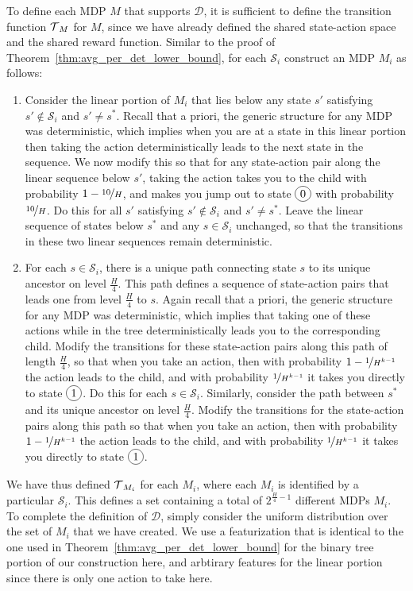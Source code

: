 \documentclass[11pt,twoside]{article}
\begin{document}
\noindent To define each MDP $M$ that supports $\mathcal{D}$, it is sufficient to define the transition function $\operatorname{\mathcal{T}}_M$ for $M$, since we have already defined the shared state-action space and the shared reward function. Similar to the proof of Theorem~\ref{thm:avg_per_det_lower_bound}, for each $\mathcal{S}_i$ construct an MDP $M_i$ as follows:
\begin{enumerate}
\item Consider the linear portion of $M_i$ that lies below any state $s'$ satisfying $s' \notin \mathcal{S}_i$ and $s' \neq s^*$. Recall that a priori, the generic structure for any MDP was deterministic, which implies when you are at a state in this linear portion then taking the action deterministically leads to the next state in the sequence. We now modify this so that for any state-action pair along the linear sequence below $s'$, taking the action takes you to the child with probability $1 - \nicefrac{10}{H}$, and makes you jump out to state $\circled{0}$ with probability $\nicefrac{10}{H}$. Do this for all $s'$ satisfying $s' \notin \mathcal{S}_i$ and $s' \neq s^*$. Leave the linear sequence of states below $s^*$ and any $s \in \mathcal{S}_i$ unchanged, so that the transitions in these two linear sequences remain deterministic.
\item For each $s \in \mathcal{S}_i$, there is a unique path connecting state $s$ to its unique ancestor on level $\frac{H}{4}$. This path defines a sequence of state-action pairs that leads one from level $\frac{H}{4}$ to $s$. Again recall that a priori, the generic structure for any MDP was deterministic, which implies that taking one of these actions while in the tree deterministically leads you to the corresponding child. Modify the transitions for these state-action pairs along this path of length $\frac{H}{4}$, so that when you take an action, then with probability $1 - \nicefrac{1}{H^{k-1}}$ the action leads to the child, and with probability $\nicefrac{1}{H^{k-1}}$ it takes you directly to state $\circled{1}$. Do this for each $s \in \mathcal{S}_i$. Similarly, consider the path between $s^*$ and its unique ancestor on level $\frac{H}{4}$. Modify the transitions for the state-action pairs along this path so that when you take an action, then with probability $1 - \nicefrac{1}{H^{k-1}}$ the action leads to the child, and with probability $\nicefrac{1}{H^{k-1}}$ it takes you directly to state $\circled{1}$.
\end{enumerate}
We have thus defined $\operatorname{\mathcal{T}}_{M_i}$ for each $M_i$, where each $M_i$ is identified by a particular $\mathcal{S}_i$. This defines a set containing a total of $2^{\frac{H}{4} - 1}$ different MDPs $M_i$. To complete the definition of $\mathcal{D}$, simply consider the uniform distribution over the set of $M_i$ that we have created. We use a featurization that is identical to the one used in Theorem~\ref{thm:avg_per_det_lower_bound} for the binary tree portion of our construction here, and arbtirary features for the linear portion since there is only one action to take here. \\
\end{document}
